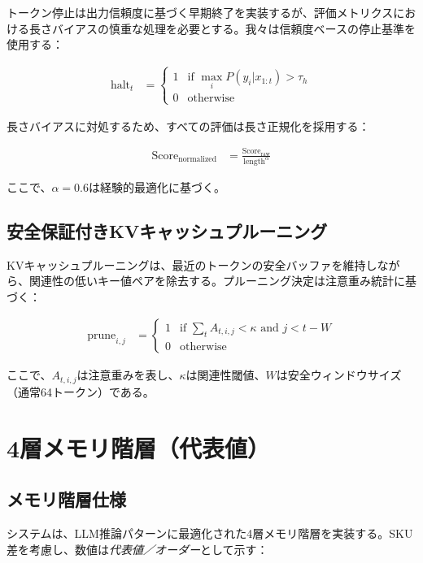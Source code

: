\documentclass[10pt,twocolumn,a4paper]{jarticle}
\begin{document}
トークン停止は出力信頼度に基づく早期終了を実装するが、評価メトリクスにおける長さバイアスの慎重な処理を必要とする。我々は信頼度ベースの停止基準を使用する：

\begin{align}
\text{halt}_t &= \begin{cases}
1 & \text{if } \max_i P(y_i | x_{1:t}) > \tau_h \\
0 & \text{otherwise}
\end{cases} \label{eq:token_halt}
\end{align}

長さバイアスに対処するため、すべての評価は長さ正規化を採用する：

\begin{align}
\text{Score}_{\text{normalized}} &= \frac{\text{Score}_{\text{raw}}}{\text{length}^{\alpha}} \label{eq:length_norm}
\end{align}

ここで、$\alpha = 0.6$は経験的最適化に基づく。

\subsection{安全保証付きKVキャッシュプルーニング}

KVキャッシュプルーニングは、最近のトークンの安全バッファを維持しながら、関連性の低いキー値ペアを除去する。プルーニング決定は注意重み統計に基づく：

\begin{align}
\text{prune}_{i,j} &= \begin{cases}
1 & \text{if } \sum_{t} A_{t,i,j} < \kappa \text{ and } j < t - W \\
0 & \text{otherwise}
\end{cases} \label{eq:kv_prune}
\end{align}

ここで、$A_{t,i,j}$は注意重みを表し、$\kappa$は関連性閾値、$W$は安全ウィンドウサイズ（通常64トークン）である。

\section{4層メモリ階層（代表値）}

\subsection{メモリ階層仕様}

システムは、LLM推論パターンに最適化された4層メモリ階層を実装する。SKU差を考慮し、数値は\emph{代表値／オーダー}として示す：
\end{document}
